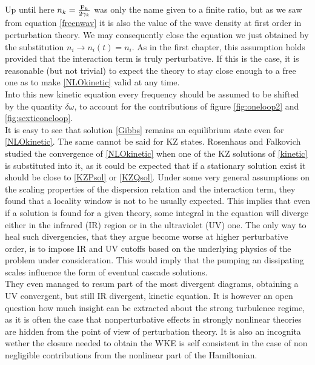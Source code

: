 Up until here $n_k = \frac{\mathrm{F}_k}{2\gamma_k}$ was only the name given to a finite ratio, but as we saw from equation \eqref{freenwav} it is also the value of the 
wave density at first order in perturbation theory. We may consequently close the equation we just obtained by the substitution $n_i \rightarrow n_i(t) = n_i$. 
As in the first chapter, this assumption holds provided that the interaction term is truly perturbative. If this is the case, it is reasonable (but not trivial) 
to expect the theory to stay close enough to a free one as to make \eqref{NLOkinetic} valid at any time. \\ 
Into this new kinetic equation every frequency should be assumed to be shifted by the quantity $\delta\omega$, to account for the contributions of 
figure \ref{fig:oneloop2} and \ref{fig:sexticoneloop}.\\

It is easy to see that solution \eqref{Gibbs} remains an equilibrium state even for \eqref{NLOkinetic}. The same cannot be said for 
KZ states. Rosenhaus and Falkovich studied the convergence of \eqref{NLOkinetic} when one of the KZ solutions of \eqref{kinetic} is substituted into it, 
as it could be expected that if a stationary solution exist it should be close to \eqref{KZPsol} or \eqref{KZQsol}. Under some very general assumptions on the 
scaling properties of the dispersion relation and the interaction term, they found that a locality window is not to be usually expected. This implies that even if 
a solution is found for a given theory, some integral in the equation will diverge either in the infrared (IR) region or in the ultraviolet (UV) one. The only way to
heal such divergencies, that they argue become worse at higher perturbative order, is to impose IR and UV cutoffs based on the underlying physics of the problem
under consideration. This would imply that the pumping an dissipating scales influence the form of eventual cascade solutions. \\
They even managed to resum part of the most divergent diagrams, obtaining a UV convergent, but still IR divergent, kinetic equation. It is however an open question 
how much insight can be extracted about the strong turbulence regime, as it is often the case that nonperturbative effects in strongly nonlinear theories are hidden
from the point of view of perturbation theory. It is also an incognita wether the closure needed to obtain the WKE is self consistent in the case of non negligible contributions 
from the nonlinear part of the Hamiltonian. \\
